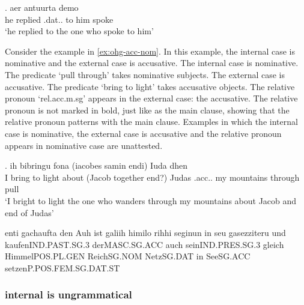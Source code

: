 \exg. aer antuurta demo  \\
 he replied\scsub{[dat]} .\ac{dat}.. {to him} spoke\scsub{[nom]}\\
 `he replied to the one who spoke to him' \label{ex:ohg-dat-nom}



Consider the example in \ref{ex:ohg-acc-nom}. In this example, the internal case is nominative and the external case is accusative.
The internal case is nominative. The predicate  `pull through' takes nominative subjects.
The external case is accusative. The predicate  `bring to light' takes accusative objects.
The relative pronoun  `\ac{rel}.\ac{acc}.\ac{m}.\ac{sg}' appears in the external case: the accusative. The relative pronoun is not marked in bold, just like as the main clause, showing that the relative pronoun patterns with the main clause.
Examples in which the internal case is nominative, the external case is accusative and the relative pronoun appears in nominative case are unattested.

\exg. ih bibringu fona (iacobes samin endi) Iuda dhen   \\
 I {bring to light}\scsub{[acc]} about (Jacob together end?) Judas .\ac{acc}.. my mountains {through pull}\scsub{[nom]}\\
 `I bright to light the one who wanders through my mountains about Jacob and end of Judas' \label{ex:ohg-acc-nom}



enti	gachaufta	den	Auh	ist	galiih	himilo	rihhi	seginun	in	seu	gasezziteru
und	kaufenIND.PAST.SG.3		derMASC.SG.ACC		auch	seinIND.PRES.SG.3	gleich	HimmelPOS.PL.GEN	ReichSG.NOM		NetzSG.DAT		in	SeeSG.ACC		setzenP.POS.FEM.SG.DAT.ST












  \subsubsection{internal is ungrammatical}

